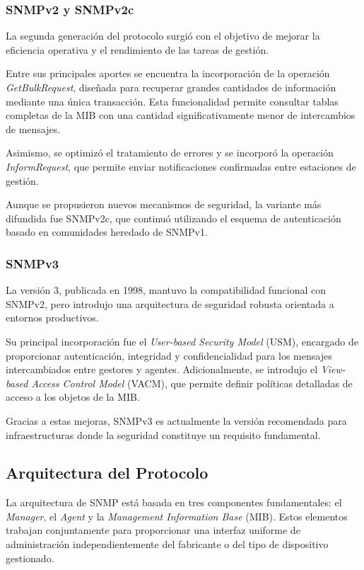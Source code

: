 \subsubsection{SNMPv2 y SNMPv2c}

La segunda generación del protocolo surgió con el objetivo de mejorar la eficiencia operativa y el rendimiento de las tareas de gestión.

Entre sus principales aportes se encuentra la incorporación de la operación \textit{GetBulkRequest}, diseñada para recuperar grandes cantidades de información mediante una única transacción. Esta funcionalidad permite consultar tablas completas de la MIB con una cantidad significativamente menor de intercambios de mensajes.

Asimismo, se optimizó el tratamiento de errores y se incorporó la operación \textit{InformRequest}, que permite enviar notificaciones confirmadas entre estaciones de gestión.

Aunque se propusieron nuevos mecanismos de seguridad, la variante más difundida fue SNMPv2c, que continuó utilizando el esquema de autenticación basado en comunidades heredado de SNMPv1.

\subsubsection{SNMPv3}

La versión 3, publicada en 1998, mantuvo la compatibilidad funcional con SNMPv2, pero introdujo una arquitectura de seguridad robusta orientada a entornos productivos.

Su principal incorporación fue el \textit{User-based Security Model} (USM), encargado de proporcionar autenticación, integridad y confidencialidad para los mensajes intercambiados entre gestores y agentes. Adicionalmente, se introdujo el \textit{View-based Access Control Model} (VACM), que permite definir políticas detalladas de acceso a los objetos de la MIB.

Gracias a estas mejoras, SNMPv3 es actualmente la versión recomendada para infraestructuras donde la seguridad constituye un requisito fundamental.

\subsection{Arquitectura del Protocolo}

La arquitectura de SNMP está basada en tres componentes fundamentales: el \textit{Manager}, el \textit{Agent} y la \textit{Management Information Base} (MIB). Estos elementos trabajan conjuntamente para proporcionar una interfaz uniforme de administración independientemente del fabricante o del tipo de dispositivo gestionado.

